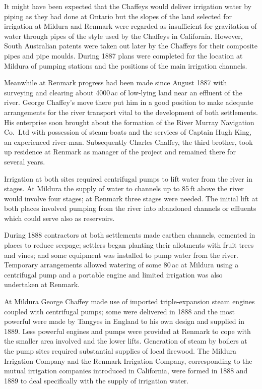 It might have been expected that the Chaffeys would deliver irrigation
water by piping as they had done at Ontario but the slopes of the land
selected for irrigation at Mildura and Renmark were regarded as
insufficient for gravitation of water through pipes of the style used
by the Chaffeys in California.  However, South Australian patents were
taken out later by the Chaffeys for their composite pipes and pipe
moulds.  During 1887 plans were completed for the location at Mildura
of pumping stations and the positions of the main irrigation
channels.

Meanwhile at Renmark progress had been made since August 1887 with
surveying and clearing about 4000\,ac of low-lying land near an
effluent of the river.  George Chaffey's move there put him in a good
position to make adequate arrangements for the river transport vital
to the development of both settlements.  His enterprise soon brought
about the formation of the River Murray Navigation Co.\ Ltd with
possession of steam-boats and the services of Captain Hugh King, an
experienced river-man.  Subsequently Charles Chaffey, the third
brother, took up residence at Renmark as manager of the project and
remained there for several years.

Irrigation at both sites required centrifugal pumps to lift water from
the river in stages.  At Mildura the supply of water to channels up to
85\,ft above the river would involve four stages; at Renmark three
stages were needed.  The initial lift at both places involved pumping
from the river into abandoned channels or effluents which could serve
also as reservoirs.

During 1888 contractors at both settlements made earthen channels,
cemented in places to reduce seepage; settlers began planting their
allotments with fruit trees and vines; and some equipment was
installed to pump water from the river.  Temporary arrangements
allowed watering of some 80\,ac at Mildura using a centrifugal pump
and a portable engine and limited irrigation was also undertaken at
Renmark.

At Mildura George Chaffey made use of imported triple-expansion steam
engines coupled with centrifugal pumps; some were delivered in 1888
and the most powerful were made by Tangyes in England to his own
design and supplied in 1889.  Less powerful engines and pumps were
provided at Renmark to cope with the smaller area involved and the
lower lifts.  Generation of steam by boilers at the pump sites
required substantial supplies of local firewood.  The Mildura
Irrigation Company and the Renmark Irrigation Company, corresponding
to the mutual irrigation companies introduced in California, were
formed in 1888 and 1889 to deal specifically with the supply of
irrigation water.



